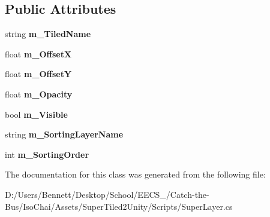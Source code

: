\subsection*{Public Attributes}
\begin{DoxyCompactItemize}
\item 
\mbox{\label{class_super_tiled2_unity_1_1_super_layer_a9c2b5e910b8ebf08942619c5dcdf8167}} 
string {\bfseries m\+\_\+\+Tiled\+Name}
\item 
\mbox{\label{class_super_tiled2_unity_1_1_super_layer_a7c5e0c7c079f9028913b4fc28113095c}} 
float {\bfseries m\+\_\+\+OffsetX}
\item 
\mbox{\label{class_super_tiled2_unity_1_1_super_layer_a2aa1f38e369dfb8e42b23e3b67141ffe}} 
float {\bfseries m\+\_\+\+OffsetY}
\item 
\mbox{\label{class_super_tiled2_unity_1_1_super_layer_a2b332493a8716cb591e3b38c0015e548}} 
float {\bfseries m\+\_\+\+Opacity}
\item 
\mbox{\label{class_super_tiled2_unity_1_1_super_layer_acaa84cbdf073f632cf4f904c925c28ad}} 
bool {\bfseries m\+\_\+\+Visible}
\item 
\mbox{\label{class_super_tiled2_unity_1_1_super_layer_a320de859e2242245da4b04b0bac98563}} 
string {\bfseries m\+\_\+\+Sorting\+Layer\+Name}
\item 
\mbox{\label{class_super_tiled2_unity_1_1_super_layer_a6461f9de4171e8a87d00aa8e7fb7b7fd}} 
int {\bfseries m\+\_\+\+Sorting\+Order}
\end{DoxyCompactItemize}


The documentation for this class was generated from the following file\+:\begin{DoxyCompactItemize}
\item 
D\+:/\+Users/\+Bennett/\+Desktop/\+School/\+E\+E\+C\+S\+\_/\+Catch-\/the-\/\+Bus/\+Iso\+Chai/\+Assets/\+Super\+Tiled2\+Unity/\+Scripts/Super\+Layer.\+cs\end{DoxyCompactItemize}
